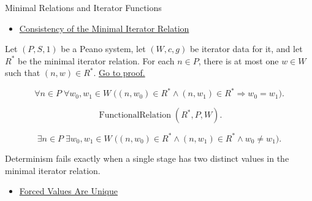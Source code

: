\begin{topicbox}{Minimal Relations and Iterator Functions}
\begin{remark*}[Dependencies]
\begin{itemize}
  \item \hyperref[lem:iterator-relation-consistency]{Consistency of the Minimal Iterator Relation}
\end{itemize}
\end{remark*}

\begin{tcolorbox}[colback=lembox, colframe=lemborder, arc=2pt,
  left=6pt, right=6pt, top=4pt, bottom=4pt,
  title={\small\textbf{Lemma (Determinism of the Minimal Iterator Relation)}},
  fonttitle=\small\bfseries]
\begin{lemma}
\label{lem:minimal-iterator-relation-deterministic}
Let $(P,S,1)$ be a Peano system, let $(W,c,g)$ be iterator data for it, and let
$R^*$ be the minimal iterator relation. For each $n\in P$, there is at most one
$w\in W$ such that $(n,w)\in R^*$.
\hyperref[prf:minimal-iterator-relation-deterministic]{Go to proof.}
\end{lemma}
\end{tcolorbox}

\begin{remark*}
\[
\forall n\in P\;\forall w_0,w_1\in W\;
\bigl((n,w_0)\in R^*\land (n,w_1)\in R^*\Longrightarrow w_0=w_1\bigr).
\]
\end{remark*}

\begin{remark*}
\[
\operatorname{FunctionalRelation}(R^*,P,W).
\]
\end{remark*}

\begin{remark*}
\[
\exists n\in P\;\exists w_0,w_1\in W\;
\bigl((n,w_0)\in R^*\land (n,w_1)\in R^*\land w_0\neq w_1\bigr).
\]
\end{remark*}

\begin{remark*}
Determinism fails exactly when a single stage has two distinct values in the
minimal iterator relation.
\end{remark*}

\begin{remark*}[Dependencies]
\begin{itemize}
  \item \hyperref[lem:forced-values-are-unique]{Forced Values Are Unique}
\end{itemize}
\end{remark*}


\end{topicbox}

